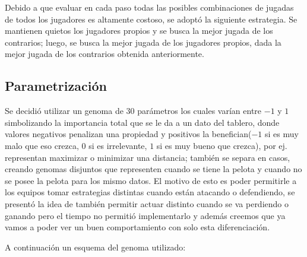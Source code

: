 Debido a que evaluar en cada paso todas las posibles combinaciones de jugadas de
todos los jugadores es altamente costoso, se adoptó la siguiente estrategia. Se
mantienen quietos los jugadores propios y se busca la mejor jugada de los
contrarios; luego, se busca la mejor jugada de los jugadores propios, dada la
mejor jugada de los contrarios obtenida anteriormente.

\subsection{Parametrización}

Se decidió utilizar un genoma de 30 parámetros los cuales varían entre $-1$ y
$1$ simbolizando la importancia total que se le da a un dato del tablero, donde valores
 negativos penalizan una propiedad y positivos la benefician($-1$ si es muy malo
 que eso crezca, $0$ si es irrelevante, $1$ si es muy bueno que
crezca), por ej. representan maximizar o minimizar una distancia; también se
separa en casos, creando genomas disjuntos que representen cuando se tiene la
pelota y cuando no se posee la pelota para los mismo datos. El motivo de esto es
poder permitirle a los equipos tomar estrategias distintas cuando están atacando
o defendiendo, se presentó la idea de también permitir actuar distinto cuando se
va perdiendo o ganando pero el tiempo no permitió implementarlo y además creemos
que ya vamos a poder ver un buen comportamiento con solo esta diferenciación.


A continuación un esquema del genoma utilizado:

